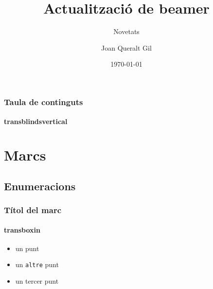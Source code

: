\documentclass[12pt]{beamer}
\title[Beamer]{Actualització de beamer}
\subtitle{Novetats}
\author[Joan Queralt]{Joan Queralt Gil}
\institute[cata\LaTeX] 
{
  cata\LaTeX{}\\
  El lloc català de \LaTeX{}
}
\date[30.07.2012]{\today}
\begin{document}
\begin{frame}
  \titlepage
  \transblindshorizontal
\end{frame}


\begin{frame}
  \frametitle{Taula de continguts} %
  \framesubtitle{transblindsvertical}
  
  \tableofcontents[pausesections] %
  \transblindsvertical
   

\end{frame}

\section{Marcs} %
\subsection{Enumeracions}


\begin{frame}
  \frametitle{Títol del marc}
  \framesubtitle{transboxin}
   \begin{itemize}
		  \item 
		    un punt
		  \item
		    un \texttt{altre} punt
		  \item
		  un tercer punt
  \end{itemize}
  \transboxin
  

\end{frame}
\end{document}
